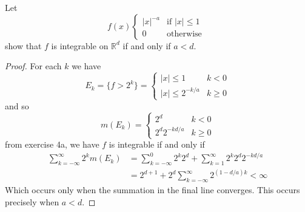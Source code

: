 \documentclass[nocolor]{report}
\begin{document}
\begin{ex}[Question 4b.] Let 
    \begin{equation}
f(x)
    \begin{cases}
        |x|^{-a} & \text{if } |x|\leq1\\
        0 & \text{otherwise } 
    \end{cases}
\end{equation}
show that $f$ is integrable on $\mathbb{R}^d$ if and only if $a < d$.
\end{ex}
\begin{proof}
    For each $k$ we have  
\begin{equation}
E_k = \{f > 2^k\} = 
    \begin{cases}
        |x| \leq 1 & k< 0 \\
        |x| \leq 2^{-k/a} & k\geq 0
    \end{cases}
\end{equation}
and so 
\begin{equation}
m(E_k) = 
    \begin{cases}
        2^d & k< 0 \\
        2^d 2^{-kd/a}  & k\geq 0
    \end{cases}
\end{equation}
from exercise 4a, we have $f$ is integrable if and only if 
\begin{align*}
    \sum_{k=-\infty}^{\infty} 2^k m(E_k) &= \sum_{k=-\infty}^{0}2^k2^d + \sum_{k=1}^{\infty} 2^k2^d 2^{-kd/a} \\
    &= 2^{d+1} + 2^d \sum_{k=-\infty}^{\infty}2^{(1-d/a)k} < \infty
\end{align*}
Which occurs only when the summation in the final line converges. This occurs precisely when $a < d$. 
\end{proof}
\end{document}
